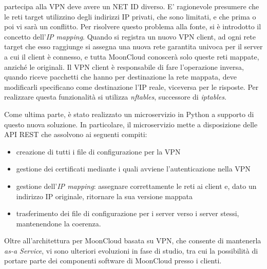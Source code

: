 \documentclass[10pt,a4paper]{article}
\begin{document}
\begin{description}
            partecipa alla VPN deve avere un NET ID diverso. E' ragionevole presumere che
            le reti target utilizzino degli indirizzi IP privati, che sono limitati, e che prima
            o poi vi sarà un conflitto. Per risolvere questo problema alla fonte, si è introdotto
            il concetto dell'\textit{IP mapping}. Quando si registra un nuovo VPN client, ad ogni
            rete target che esso raggiunge si assegna una nuova rete garantita univoca per
            il server a cui il client è connesso, e tutta MoonCloud conoscerà solo queste
            reti mappate, anziché le originali.
            Il VPN client è responsabile di fare l'operazione inversa, quando riceve pacchetti
            che hanno per destinazione la rete mappata, deve modificarli specificano come
            destinazione l'IP reale, viceversa per le risposte.
            Per realizzare questa funzionalità si utilizza \textit{nftables}, successore
            di \textit{iptables}.
        \end{description}


        Come ultima parte, è stato realizzato un microservizio in Python 
        a supporto di questo nuova soluzione.
        In particolare, il microservizio mette a disposizione delle API REST che
        assolvono ai seguenti compiti:
        \begin{itemize}
            \item creazione di tutti i file di configurazione per la VPN
            \item gestione dei certificati mediante i quali avviene l'autenticazione
            nella VPN
            \item gestione dell'\textit{IP mapping}: assegnare correttamente le reti
            ai client e, dato un indirizzo IP originale, ritornare la sua versione mappata
            \item trasferimento dei file di configurazione per i server verso i server stessi,
            mantenendone la coerenza.
        \end{itemize}


        Oltre all'architettura per MoonCloud basata su VPN, che consente di mantenerla
        \textit{as-a Service}, vi sono ulteriori evoluzioni in fase di studio, tra cui
        la possibilità di portare parte dei componenti software di MoonCloud presso i clienti.

    
\end{document}
